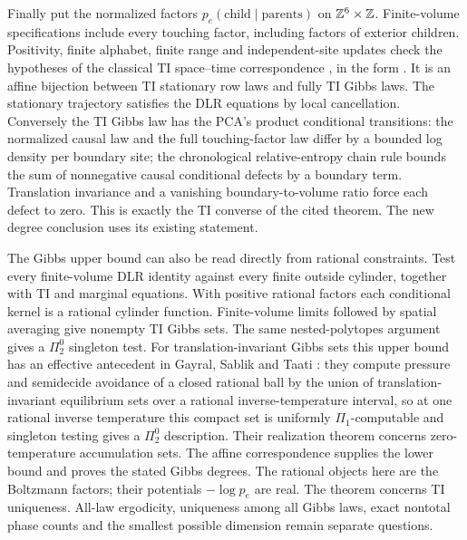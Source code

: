 Finally put the normalized factors $p_e(\text{child}\mid\text{parents})$ on $\mathbb{Z}^6\times\mathbb{Z}$. Finite-volume specifications include every touching factor, including factors of exterior children. Positivity, finite alphabet, finite range and independent-site updates check the hypotheses of the classical TI space--time correspondence \cite{GKLM89}, in the form \cite[Lemma~2.4, Theorem~10.3 and Corollary~10.4]{DM26}. It is an affine bijection between TI stationary row laws and fully TI Gibbs laws. The stationary trajectory satisfies the DLR equations by local cancellation. Conversely the TI Gibbs law has the PCA's product conditional transitions: the normalized causal law and the full touching-factor law differ by a bounded log density per boundary site; the chronological relative-entropy chain rule bounds the sum of nonnegative causal conditional defects by a boundary term. Translation invariance and a vanishing boundary-to-volume ratio force each defect to zero. This is exactly the TI converse of the cited theorem. The new degree conclusion uses its existing statement.

The Gibbs upper bound can also be read directly from rational constraints. Test every finite-volume DLR identity against every finite outside cylinder, together with TI and marginal equations. With positive rational factors each conditional kernel is a rational cylinder function. Finite-volume limits followed by spatial averaging give nonempty TI Gibbs sets. The same nested-polytopes argument gives a $\Pi^0_2$ singleton test. For translation-invariant Gibbs sets this upper bound has an effective antecedent in Gayral, Sablik and Taati \cite[Propositions~14--15]{GST25}: they compute pressure and semidecide avoidance of a closed rational ball by the union of translation-invariant equilibrium sets over a rational inverse-temperature interval, so at one rational inverse temperature this compact set is uniformly $\Pi_1$-computable and singleton testing gives a $\Pi^0_2$ description. Their realization theorem concerns zero-temperature accumulation sets. The affine correspondence supplies the lower bound and proves the stated Gibbs degrees. The rational objects here are the Boltzmann factors; their potentials $-\log p_e$ are real. The theorem concerns TI uniqueness. All-law ergodicity, uniqueness among all Gibbs laws, exact nontotal phase counts and the smallest possible dimension remain separate questions.
